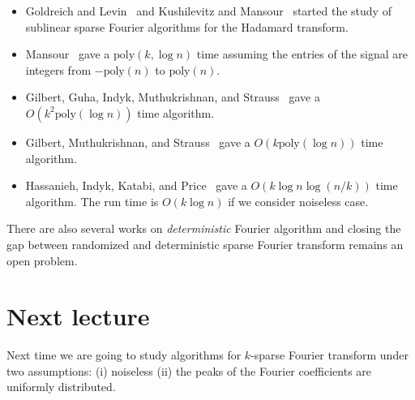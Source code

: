 \documentclass[11pt]{article}
\begin{document}
\begin{itemize}
	\item Goldreich and Levin~\cite{GoldreichL89} and Kushilevitz and Mansour~\cite{KushilevitzM91} started the study of sublinear sparse Fourier algorithms for the Hadamard transform. 
	\item Mansour~\cite{Mansour92} gave a $\text{poly}(k,\log n)$ time assuming the entries of the signal are integers from $-\text{poly}(n)$ to $\text{poly}(n)$.
	\item Gilbert, Guha, Indyk, Muthukrishnan, and Strauss~\cite{GilbertGIMS02} gave a $O(k^2\text{poly}(\log n))$ time algorithm.
	\item Gilbert, Muthukrishnan, and Strauss~\cite{Gilbert05} gave a $O(k\text{poly}(\log n))$ time algorithm.
	\item Hassanieh, Indyk, Katabi, and Price~\cite{HassaniehIKP12} gave a $O(k\log n\log(n/k))$ time algorithm. The run time is $O(k\log n)$ if we consider noiseless case.
\end{itemize}

There are also several works on \textit{deterministic} Fourier algorithm and closing the gap between randomized and deterministic sparse Fourier transform remains an open problem.

\section{Next lecture}
Next time we are going to study algorithms for $k$-sparse Fourier transform under two assumptions: (i) noiseless (ii) the peaks of the Fourier coefficients are uniformly distributed.


\end{document}
